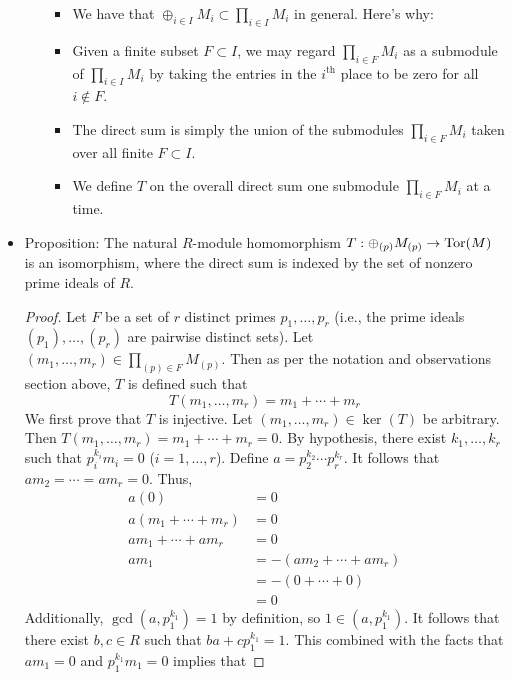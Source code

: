 \documentclass[../notes.tex]{subfiles}
\begin{document}
\begin{itemize}
\begin{enumerate}
        \begin{itemize}
            \item We have that $\oplus_{i\in I}M_i\subset\prod_{i\in I}M_i$ in general. Here's why:
            \item Given a finite subset $F\subset I$, we may regard $\prod_{i\in F}M_i$ as a submodule of $\prod_{i\in I}M_i$ by taking the entries in the $i^\text{th}$ place to be zero for all $i\notin F$.
            \item The direct sum is simply the union of the submodules $\prod_{i\in F}M_i$ taken over all finite $F\subset I$.
            \item We define $T$ on the overall direct sum one submodule $\prod_{i\in F}M_i$ at a time.
        \end{itemize}
    \end{enumerate}
    \item Proposition: The natural $R$-module homomorphism $T:\oplus_{(p)}M_{(p)}\to\operatorname{Tor}(M)$ is an isomorphism, where the direct sum is indexed by the set of nonzero prime ideals of $R$.
    \begin{proof}
        Let $F$ be a set of $r$ distinct primes $p_1,\dots,p_r$ (i.e., the prime ideals $(p_1),\dots,(p_r)$ are pairwise distinct sets). Let $(m_1,\dots,m_r)\in\prod_{(p)\in F}M_{(p)}$. Then as per the notation and observations section above, $T$ is defined such that
        \begin{equation*}
            T(m_1,\dots,m_r) = m_1+\cdots+m_r
        \end{equation*}
        We first prove that $T$ is injective. Let $(m_1,\dots,m_r)\in\ker(T)$ be arbitrary. Then $T(m_1,\dots,m_r)=m_1+\cdots+m_r=0$. By hypothesis, there exist $k_1,\dots,k_r$ such that $p_i^{k_i}m_i=0$ ($i=1,\dots,r$). Define $a=p_2^{k_2}\cdots p_r^{k_r}$. It follows that $am_2=\cdots=am_r=0$. Thus,
        \begin{align*}
            a(0) &= 0\\
            a(m_1+\cdots+m_r) &= 0\\
            am_1+\cdots+am_r &= 0\\
            am_1 &= -(am_2+\cdots+am_r)\\
            &= -(0+\cdots+0)\\
            &= 0
        \end{align*}
        Additionally, $\gcd(a,p_1^{k_1})=1$ by definition, so $1\in(a,p_1^{k_1})$. It follows that there exist $b,c\in R$ such that $ba+cp_1^{k_1}=1$. This combined with the facts that $am_1=0$ and $p_1^{k_1}m_1=0$ implies that

\end{proof}
\end{itemize}
\end{document}
